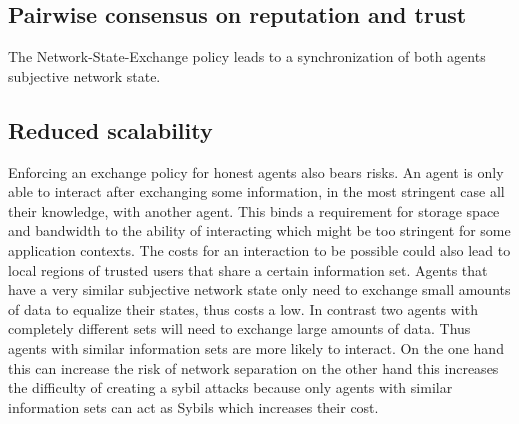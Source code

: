 \subsection{Pairwise consensus on reputation and trust}
The Network-State-Exchange policy leads to a synchronization of both agents subjective network state.


\subsection{Reduced scalability}
Enforcing an exchange policy for honest agents also bears risks. An agent is only able to interact
after exchanging some information, in the most stringent case all their knowledge, with another agent. 
This binds a requirement for storage space and bandwidth to the ability of interacting which might 
be too stringent for some application contexts. The costs for an interaction to be possible could 
also lead to local regions of trusted users that share a certain information set. Agents that have
a very similar subjective network state only need to exchange small amounts of data to equalize their
states, thus costs a low. In contrast two agents with completely different sets will need to
exchange large amounts of data. Thus agents with similar information sets are more likely to interact.
On the one hand this can increase the risk of network separation on the other hand this increases 
the difficulty of creating a sybil attacks because only agents with similar information sets can 
act as Sybils which increases their cost.

